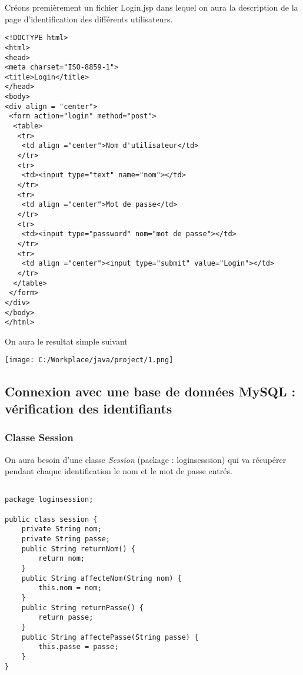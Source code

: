 \documentclass[12]{article}
\begin{document}
Créons premièrement un fichier Login.jsp dans lequel on aura la description de la page d'identification des différents utilisateurs.

\lstset{language=XML}
\begin{small}
\begin{lstlisting}
<!DOCTYPE html>
<html>
<head>
<meta charset="ISO-8859-1">
<title>Login</title>
</head>
<body>
<div align = "center"> 
 <form action="login" method="post">
  <table>
   <tr>
    <td align ="center">Nom d'utilisateur</td>
   </tr>
   <tr>
    <td><input type="text" name="nom"></td>
   </tr>
   <tr>
    <td align ="center">Mot de passe</td>
   </tr>
   <tr>
    <td><input type="password" nom="mot de passe"></td>
   </tr>
   <tr>
    <td align ="center"><input type="submit" value="Login"></td>
   </tr>
  </table>
 </form>
</div>
</body>
</html>
\end{lstlisting}
\end{small}
\newpage
On aura le resultat simple suivant\\

\begin{center}
\texttt{[image: C:/Workplace/java/project/1.png]}
\end{center}




\subsection{Connexion avec une base de données MySQL : vérification des identifiants}


\subsubsection{Classe Session}
On aura besoin d'une classe \textit{Session} (package : loginsesssion) qui va récupérer pendant chaque identification le nom et le mot de passe entrés.\\

\lstset{language=java}
\begin{lstlisting}

package loginsession;

public class session {
	private String nom;
	private String passe;
	public String returnNom() {
		return nom;
	}
	public String affecteNom(String nom) {
		this.nom = nom;
	}
	public String returnPasse() {
		return passe;
	}
	public String affectePasse(String passe) {
		this.passe = passe;
	}
}

\end{lstlisting}
\end{document}
